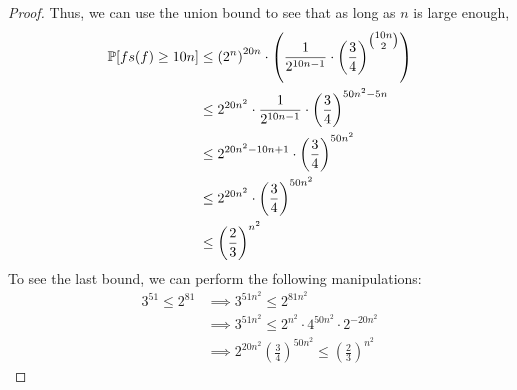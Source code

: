 \documentclass[letterpaper]{article}
\begin{document}
\begin{proof}
    Thus, we can use the union bound to see that as long as $n$ is large enough,
    \begin{align*}
        \mathbb{P}[fs(f) \ge 10n]
         & \le \left(2^n\right)^{20n} \cdot \left(\frac{1}{2^{10n-1}} \cdot \left(\frac{3}{4}\right)^{\tbinom{10n}{2}}\right)        \\
         & \le 2^{20n^2} \cdot \frac{1}{2^{10n-1}} \cdot \left(\frac{3}{4}\right)^{50n^2-5n}                                           \\
         & \le 2^{20n^2-10n+1} \cdot \left(\frac{3}{4}\right)^{50n^2}                                                                      \\
         & \le 2^{20n^2} \cdot \left(\frac{3}{4}\right)^{50n^2}                                                                      \\
         & \le \left(\frac{2}{3}\right)^{n^2}
    \end{align*}
    To see the last bound, we can perform the following manipulations:
    \begin{align*}
        3^{51} \le 2^{81}
        &\implies 3^{51n^2} \le 2^{81n^2} \\
        &\implies 3^{51n^2} \le 2^{n^2} \cdot 4^{50n^2} \cdot 2^{-20n^2} \\
        &\implies 2^{20n^2}\left(\frac{3}{4}\right)^{50n^2} \le \left(\frac{2}{3}\right)^{n^2}
    \end{align*}
\end{proof}
\end{document}
